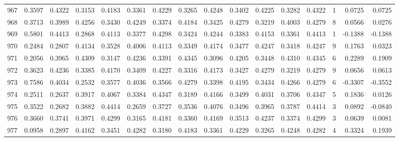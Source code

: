 \begin{tabular}{lrrrrrrrrrrrrrrr}
967 &      0.3597 &  0.4322 &  0.3153 &  0.4183 &  0.3361 &  0.4229 &  0.3265 &  0.4248 &  0.3402 &  0.4225 &   0.3282 &     0.4322 &      1 &                    0.0725 &                     0.0725 \\
968 &      0.3713 &  0.3989 &  0.4256 &  0.3430 &  0.4249 &  0.3374 &  0.4184 &  0.3425 &  0.4279 &  0.3219 &   0.4003 &     0.4279 &      8 &                    0.0566 &                     0.0276 \\
969 &      0.5801 &  0.4413 &  0.2868 &  0.4113 &  0.3377 &  0.4298 &  0.3424 &  0.4244 &  0.3383 &  0.4153 &   0.3361 &     0.4413 &      1 &                   -0.1388 &                    -0.1388 \\
970 &      0.2484 &  0.2807 &  0.4134 &  0.3528 &  0.4006 &  0.4113 &  0.3349 &  0.4174 &  0.3477 &  0.4247 &   0.3418 &     0.4247 &      9 &                    0.1763 &                     0.0323 \\
971 &      0.2056 &  0.3965 &  0.4309 &  0.3147 &  0.4236 &  0.3391 &  0.4345 &  0.3096 &  0.4205 &  0.3448 &   0.4310 &     0.4345 &      6 &                    0.2289 &                     0.1909 \\
972 &      0.3623 &  0.4236 &  0.3385 &  0.4170 &  0.3409 &  0.4227 &  0.3316 &  0.4173 &  0.3427 &  0.4279 &   0.3219 &     0.4279 &      9 &                    0.0656 &                     0.0613 \\
973 &      0.7586 &  0.4034 &  0.2532 &  0.3577 &  0.4036 &  0.3566 &  0.4279 &  0.3398 &  0.4195 &  0.3434 &   0.4266 &     0.4279 &      6 &                   -0.3307 &                    -0.3552 \\
974 &      0.2511 &  0.2637 &  0.3917 &  0.4067 &  0.3384 &  0.4347 &  0.3189 &  0.4166 &  0.3499 &  0.4031 &   0.3706 &     0.4347 &      5 &                    0.1836 &                     0.0126 \\
975 &      0.3522 &  0.2682 &  0.3882 &  0.4414 &  0.2659 &  0.3727 &  0.3536 &  0.4076 &  0.3496 &  0.3965 &   0.3787 &     0.4414 &      3 &                    0.0892 &                    -0.0840 \\
976 &      0.3660 &  0.3741 &  0.3971 &  0.4299 &  0.3165 &  0.4181 &  0.3360 &  0.4169 &  0.3513 &  0.4237 &   0.3374 &     0.4299 &      3 &                    0.0639 &                     0.0081 \\
977 &      0.0958 &  0.2897 &  0.4162 &  0.3451 &  0.4282 &  0.3180 &  0.4183 &  0.3361 &  0.4229 &  0.3265 &   0.4248 &     0.4282 &      4 &                    0.3324 &                     0.1939 \\

\end{tabular}
